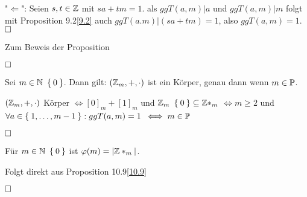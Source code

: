 \documentclass{../../meta/tudscript}
\begin{document}
                "$\Leftarrow$": Seien $s,t \in \mathbb{Z}$ mit $sa + tm = 1$. als $ggT(a,m)|a$ und $ggT(a,m)|m$ folgt mit Proposition 9.2\ref{9.2} auch $ggT(a.m)|(sa+tm) = 1$, 
                also $ggT(a,m) = 1$.
                $\hfill\square$

                Zum Beweis der Proposition
                
                $\hfill\square$
                
            Sei $m \in \mathbb{N} \ \Set{0}$. Dann gilt: $(\mathbb{Z}_m, +, \cdot)$ ist ein Körper, genau dann wenn $m \in \mathbb{P}$.

                $(\mathbb{Z}_m, +, \cdot)$ Körper $\iff [0]_m + [1]_m$ und $\mathbb{Z}_m \ \Set{0} \subseteq \mathbb{Z}*_m$
                $\iff m \geq 2$ und $\forall a \in \Set{1, \ldots, m-1}: ggT(a,m) = 1$ $\iff m \in \mathbb{P}$
                
                $\hfill\square$

            Für $m \in \mathbb{N} \ \Set{0}$ ist $\varphi(m) = |\mathbb{Z}*_m|$. 

                Folgt direkt aus Proposition 10.9\ref{10.9}

                $\hfill\square$
\end{document}
